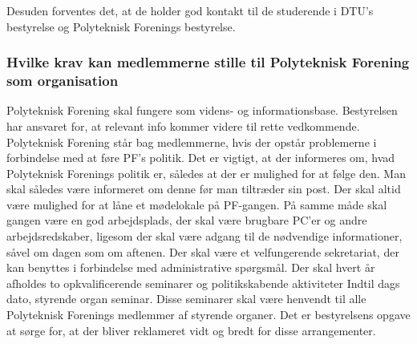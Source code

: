 Desuden forventes det, at de holder god kontakt til de studerende i DTU’s bestyrelse og Polyteknisk Forenings
bestyrelse.

\subsubsection{Hvilke krav kan medlemmerne stille til Polyteknisk Forening som organisation}
Polyteknisk Forening skal fungere som videns- og informationsbase. Bestyrelsen har ansvaret for, at relevant info kommer videre til rette vedkommende. Polyteknisk Forening står bag medlemmerne, hvis der opstår problemerne i forbindelse med at føre PF’s politik. Det er vigtigt, at der informeres om, hvad Polyteknisk Forenings politik er, således at der er mulighed for at følge den. Man skal således være informeret om denne før man tiltræder sin post. Der skal altid være mulighed for at låne et mødelokale på PF-gangen. På samme måde skal gangen være en god arbejdsplads, der skal være brugbare PC'er og andre arbejdsredskaber, ligesom der skal være adgang til de nødvendige informationer, såvel om dagen som om aftenen. Der skal være et velfungerende sekretariat, der kan benyttes i forbindelse med administrative spørgsmål. Der skal hvert år afholdes to opkvalificerende seminarer og politikskabende aktiviteter Indtil dags dato, styrende organ seminar. Disse seminarer skal være henvendt til alle Polyteknisk Forenings medlemmer af styrende organer. Det er bestyrelsens opgave at sørge for, at der bliver reklameret vidt og bredt for disse arrangementer.